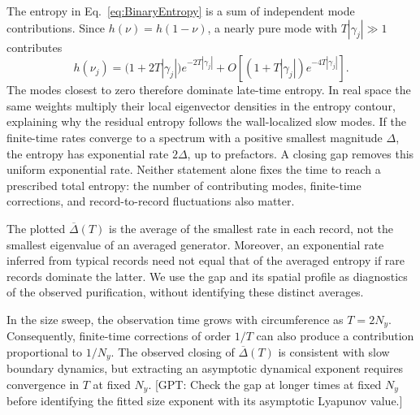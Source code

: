 \documentclass[aps,prb,10pt,twocolumn,superscriptaddress,longbibliography,floatfix]{revtex4-2}
\newcommand{\GPT}[1]{{\color{magenta}[GPT: #1]}}
\begin{document}
{The entropy in Eq.~\eqref{eq:BinaryEntropy} is a sum of independent mode contributions. Since $h(\nu)=h(1-\nu)$, a nearly pure mode with $T|\gamma_j|\gg1$ contributes
\begin{equation}
    h(\nu_j)=
    \big(1+2T|\gamma_j|\big)e^{-2T|\gamma_j|}
    +O\!\left[(1+T|\gamma_j|)e^{-4T|\gamma_j|}\right].
    \label{eq:PurificationEntropyAsymptotic}
\end{equation}
The modes closest to zero therefore dominate late-time entropy. In real space the same weights multiply their local eigenvector densities in the entropy contour, explaining why the residual entropy follows the wall-localized slow modes. If the finite-time rates converge to a spectrum with a positive smallest magnitude $\Delta$, the entropy has exponential rate $2\Delta$, up to prefactors. A closing gap removes this uniform exponential rate. Neither statement alone fixes the time to reach a prescribed total entropy: the number of contributing modes, finite-time corrections, and record-to-record fluctuations also matter.

The plotted $\overline{\Delta}(T)$ is the average of the smallest rate in each record, not the smallest eigenvalue of an averaged generator. Moreover, an exponential rate inferred from typical records need not equal that of the averaged entropy if rare records dominate the latter. We use the gap and its spatial profile as diagnostics of the observed purification, without identifying these distinct averages.

In the size sweep, the observation time grows with circumference as $T=2N_y$. Consequently, finite-time corrections of order $1/T$ can also produce a contribution proportional to $1/N_y$. The observed closing of $\overline{\Delta}(T)$ is consistent with slow boundary dynamics, but extracting an asymptotic dynamical exponent requires convergence in $T$ at fixed $N_y$.
\GPT{Check the gap at longer times at fixed $N_y$ before identifying the fitted size exponent with its asymptotic Lyapunov value.}
}
\end{document}
